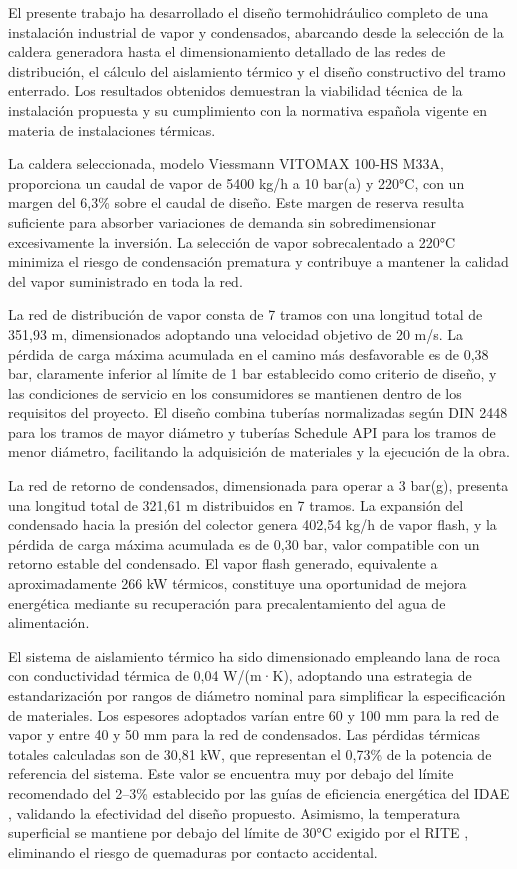 \documentclass[12pt]{article}
\begin{document}
El presente trabajo ha desarrollado el diseño termohidráulico completo de una instalación industrial de vapor y condensados, abarcando desde la selección de la caldera generadora hasta el dimensionamiento detallado de las redes de distribución, el cálculo del aislamiento térmico y el diseño constructivo del tramo enterrado. Los resultados obtenidos demuestran la viabilidad técnica de la instalación propuesta y su cumplimiento con la normativa española vigente en materia de instalaciones térmicas.

La caldera seleccionada, modelo Viessmann VITOMAX 100-HS M33A, proporciona un caudal de vapor de 5400 kg/h a 10 bar(a) y 220°C, con un margen del 6,3\% sobre el caudal de diseño. Este margen de reserva resulta suficiente para absorber variaciones de demanda sin sobredimensionar excesivamente la inversión. La selección de vapor sobrecalentado a 220°C minimiza el riesgo de condensación prematura y contribuye a mantener la calidad del vapor suministrado en toda la red.

La red de distribución de vapor consta de 7 tramos con una longitud total de 351,93 m, dimensionados adoptando una velocidad objetivo de 20 m/s. La pérdida de carga máxima acumulada en el camino más desfavorable es de 0,38 bar, claramente inferior al límite de 1 bar establecido como criterio de diseño, y las condiciones de servicio en los consumidores se mantienen dentro de los requisitos del proyecto. El diseño combina tuberías normalizadas según DIN 2448 \cite{DIN2448} para los tramos de mayor diámetro y tuberías Schedule API \cite{API605} para los tramos de menor diámetro, facilitando la adquisición de materiales y la ejecución de la obra.

La red de retorno de condensados, dimensionada para operar a 3 bar(g), presenta una longitud total de 321,61 m distribuidos en 7 tramos. La expansión del condensado hacia la presión del colector genera 402,54 kg/h de vapor flash, y la pérdida de carga máxima acumulada es de 0,30 bar, valor compatible con un retorno estable del condensado. El vapor flash generado, equivalente a aproximadamente 266 kW térmicos, constituye una oportunidad de mejora energética mediante su recuperación para precalentamiento del agua de alimentación.

El sistema de aislamiento térmico ha sido dimensionado empleando lana de roca con conductividad térmica de 0,04 W/(m·K), adoptando una estrategia de estandarización por rangos de diámetro nominal para simplificar la especificación de materiales. Los espesores adoptados varían entre 60 y 100 mm para la red de vapor y entre 40 y 50 mm para la red de condensados. Las pérdidas térmicas totales calculadas son de 30,81 kW, que representan el 0,73\% de la potencia de referencia del sistema. Este valor se encuentra muy por debajo del límite recomendado del 2--3\% establecido por las guías de eficiencia energética del IDAE \cite{IDAE2007}, validando la efectividad del diseño propuesto. Asimismo, la temperatura superficial se mantiene por debajo del límite de 30°C exigido por el RITE \cite{RITE2007}, eliminando el riesgo de quemaduras por contacto accidental.
\end{document}
